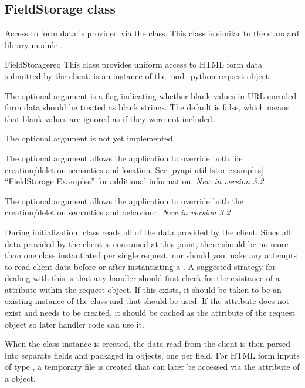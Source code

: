 \subsection{FieldStorage class\label{pyapi-util-fstor}}

Access to form data is provided via the 
class. This class is similar to the standard library module
 .

\begin{classdesc}{FieldStorage}{req}
  This class provides uniform access to HTML form data submitted by the
  client.   is an instance of the mod_python request object.

  The optional argument  is a flag indicating
  whether blank values in URL encoded form data should be treated as
  blank strings. The default is false, which means that blank values are
  ignored as if they were not included.

  The optional argument  is not yet implemented.

  The optional argument  allows the application to override
  both file creation/deletion semantics and location. See
  \ref{pyapi-util-fstor-examples} ``FieldStorage Examples'' for additional
  information. \emph{New in version 3.2}

  The optional argument  allows the application to override
  both the creation/deletion semantics and behaviour. \emph{New in version 3.2}

  During initialization,  class reads all of the
  data provided by the client. Since all data provided by the client is
  consumed at this point, there should be no more than one
   class instantiated per single request, nor should
  you make any attempts to read client data before or after
  instantiating a . A suggested strategy for dealing
  with this is that any handler should first check for the existance of
  a  attribute within the request object. If this exists, it
  should be taken to be an existing instance of the 
  class and that should be used. If the attribute does not exist
  and needs to be created, it should be cached as the 
  attribute of the request object so later handler code can use it.

  When the  class instance is created, the data read
  from the client is then parsed into separate fields and packaged in
   objects, one per field. For HTML form inputs of type
  , a temporary file is created that can later be accessed via
  the  attribute of a  object.


\end{classdesc}
